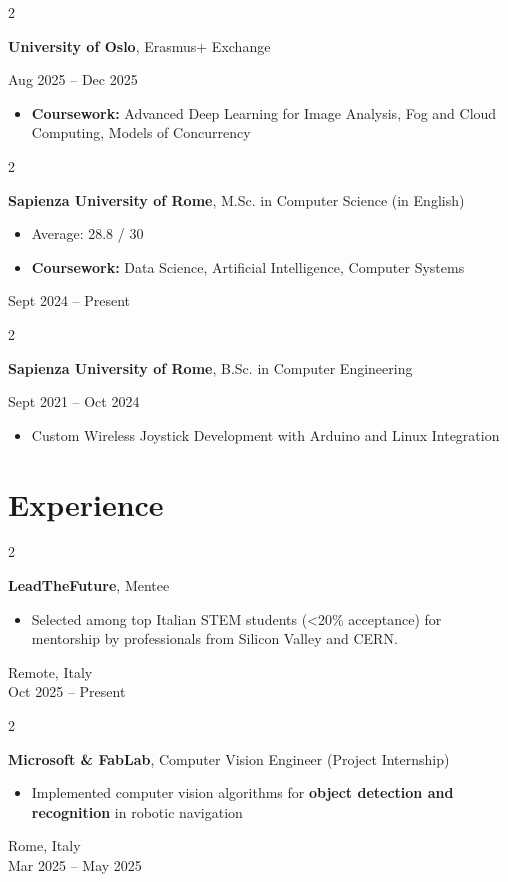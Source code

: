 \documentclass[10pt, letterpaper]{article}
\newenvironment{highlights}{
    \begin{itemize}[
        topsep=0.0 cm,
        parsep=0cm,
        partopsep=0pt,
        itemsep=0pt,
        leftmargin=0.15 cm + 10pt
    ]
}{
    \end{itemize}
} %
\newenvironment{twocolentry}[2][]{
    \onecolentry
    \def\secondColumn{#2}
    \setcolumnwidth{\fill, 4.5 cm}
    \begin{paracol}{2}
}{
    \switchcolumn \raggedleft \secondColumn
    \end{paracol}
    \endonecolentry
} %
\let\hrefWithoutArrow\href
\renewcommand{\href}[2]{\hrefWithoutArrow{#1}{\ifthenelse{\equal{#2}{}}{ }{#2 }\raisebox{.15ex}{\footnotesize \faExternalLink*}}}
\begin{document}
\begin{twocolentry}{
    Aug 2025 – Dec 2025
}
    \textbf{University of Oslo}, Erasmus+ Exchange

\end{twocolentry}
    \begin{highlights}
        \item \textbf{Coursework:} Advanced Deep Learning for Image Analysis, Fog and Cloud Computing, Models of Concurrency
    \end{highlights}
\begin{twocolentry}{
    Sept 2024 – Present
}
    \textbf{Sapienza University of Rome}, M.Sc. in Computer Science (in English)
    \begin{highlights}
        \item Average: 28.8 / 30
        \item \textbf{Coursework:} Data Science, Artificial Intelligence, Computer Systems
    \end{highlights}
\end{twocolentry}

\begin{twocolentry}{
    Sept 2021 – Oct 2024
}
    \textbf{Sapienza University of Rome}, B.Sc. in Computer Engineering

\end{twocolentry}
    \begin{highlights}
        \item \href{https://www.federicogerardi.ovh/bachelor_thesis.pdf}{\textbf{Thesis:}} Custom Wireless Joystick Development with Arduino and Linux Integration
    \end{highlights}

\section{Experience}

\begin{twocolentry}{
    Remote, Italy \\
    Oct 2025 – Present
}
    \textbf{LeadTheFuture}, Mentee
    \begin{highlights}
        \item  Selected among top Italian STEM students (<20\% acceptance) for mentorship by professionals from Silicon Valley and CERN.
    \end{highlights}
\end{twocolentry}

\begin{twocolentry}{
    Rome, Italy \\
    Mar 2025 – May 2025
}
    \textbf{Microsoft \& FabLab}, Computer Vision Engineer (Project Internship)
    \begin{highlights}
        \item Implemented computer vision algorithms for \textbf{object detection and recognition} in robotic navigation
    \end{highlights}
\end{twocolentry}
\end{document}
